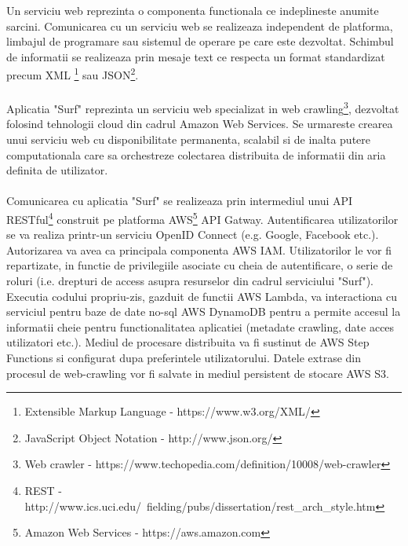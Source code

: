 \newcommand{\xmlDescription}{Extensible Markup Language - https://www.w3.org/XML/}
\newcommand{\jsonDescription}{JavaScript Object Notation - http://www.json.org/}
\newcommand{\crawlDescription}{Web crawler - https://www.techopedia.com/definition/10008/web-crawler}
\newcommand{\restDescription}{REST - http://www.ics.uci.edu/~fielding/pubs/dissertation/rest\_arch\_style.htm}
\newcommand{\awsDescription}{Amazon Web Services - https://aws.amazon.com}

Un serviciu web reprezinta o componenta functionala ce indeplineste anumite sarcini. Comunicarea cu un serviciu web se realizeaza independent de platforma, limbajul de programare sau sistemul de operare pe care este dezvoltat. Schimbul de informatii se realizeaza prin mesaje text ce respecta un format standardizat precum XML \footnote{\xmlDescription} sau JSON\footnote{\jsonDescription}. 
\\
\\
Aplicatia "Surf" reprezinta un serviciu web specializat in web crawling\footnote{\crawlDescription}, dezvoltat folosind tehnologii cloud din cadrul Amazon Web Services. Se urmareste crearea unui serviciu web cu disponibilitate permanenta, scalabil si de inalta putere computationala care sa orchestreze colectarea distribuita de informatii din aria definita de utilizator.
\\
\\
Comunicarea cu aplicatia "Surf" se realizeaza prin intermediul unui API RESTful\footnote{\restDescription} construit pe platforma AWS\footnote{\awsDescription} API Gatway. Autentificarea utilizatorilor se va realiza printr-un serviciu OpenID Connect (e.g. Google, Facebook etc.). Autorizarea va avea ca principala componenta AWS IAM. Utilizatorilor le vor fi repartizate, in functie de privilegiile asociate cu cheia de autentificare, o serie de roluri (i.e. drepturi de access asupra resurselor din cadrul serviciului "Surf"). Executia codului propriu-zis, gazduit de functii AWS Lambda, va interactiona cu serviciul pentru baze de date no-sql AWS DynamoDB pentru a permite accesul la informatii cheie pentru functionalitatea aplicatiei (metadate crawling, date acces utilizatori etc.). Mediul de procesare distribuita va fi sustinut de AWS Step Functions si configurat dupa preferintele utilizatorului. Datele extrase din procesul de web-crawling vor fi salvate in mediul persistent de stocare AWS S3.
